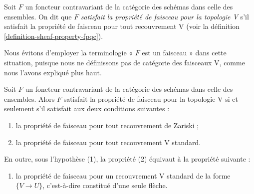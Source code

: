 \begin{definition}
\label{definition-sheaf-property-V}
Soit $F$ un foncteur contravariant de la catégorie
des schémas dans celle des ensembles. On dit que
$F$ {\it satisfait la propriété de faisceau pour la topologie V}
s'il satisfait la propriété de faisceau pour tout recouvrement V
(voir la définition \ref{definition-sheaf-property-fpqc}).
\end{definition}

\noindent
Nous évitons d'employer la terminologie « $F$ est un faisceau » dans cette
situation, puisque nous ne définissons pas de catégorie des faisceaux V,
comme nous l'avons expliqué plus haut.

\begin{lemma}
\label{lemma-sheaf-property-V}
Soit $F$ un foncteur contravariant de la catégorie
des schémas dans celle des ensembles. Alors $F$ satisfait
la propriété de faisceau pour la topologie V si et seulement
s'il satisfait aux deux conditions suivantes :
\begin{enumerate}
\item la propriété de faisceau pour tout recouvrement de Zariski ;
\item la propriété de faisceau pour tout recouvrement V standard.
\end{enumerate}
En outre, sous l'hypothèse (1), la propriété (2) équivaut à la
propriété suivante :
\begin{enumerate}
\item[(2')] la propriété de faisceau pour un recouvrement V standard
de la forme $\{V \to U\}$, c'est-à-dire constitué d'une seule flèche.
\end{enumerate}
\end{lemma}

